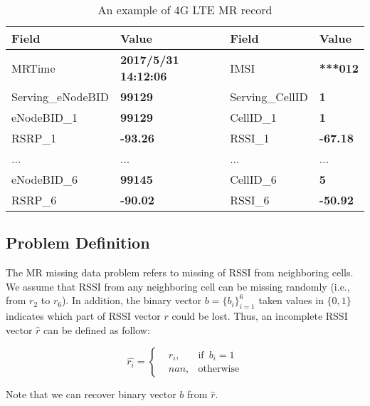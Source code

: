 \begin{table}\scriptsize
\caption{An example of 4G LTE MR record}\label{tab:mr}
  \centering
  \begin{tabular}{|l|l||l|l|}
  \hline
  \textbf{Field}    & \textbf{Value}                 & \textbf{Field}    & \textbf{Value}   \\ \hline \hline
  MRTime            & \textbf{2017/5/31 14:12:06}    & IMSI              & \textbf{***012}  \\ \hline
  Serving\_eNodeBID & \textbf{99129}                 & Serving\_CellID   & \textbf{1}       \\ \hline
  eNodeBID\_1       & \textbf{99129}                 & CellID\_1         & \textbf{1}       \\ \hline
  RSRP\_1           & \textbf{-93.26}                & RSSI\_1           & \textbf{-67.18}  \\ \hline
  ...               & ...                            & ...               & ...              \\ \hline
  eNodeBID\_6       & \textbf{99145}                 & CellID\_6         & \textbf{5}       \\ \hline
  RSRP\_6           & \textbf{-90.02}                & RSSI\_6           & \textbf{-50.92}  \\ \hline
  \end{tabular}
\end{table}

\subsection{Problem Definition}
The MR missing data problem refers to missing of RSSI from neighboring cells. We assume that RSSI from any neighboring cell can be missing randomly (i.e., from $r_2$ to $r_6$). In addition, the binary vector $b=\{b_i\}_{i=1}^6$ taken values in $\{0, 1\}$ indicates which part of RSSI vector $r$ could be lost. Thus, an incomplete RSSI vector $\hat{r}$ can be defined as follow:

\begin{equation}\label{eq:rssi}
\hat{r_i}=\left\{
\begin{aligned}
&r_i, & \text{if}\enspace b_i=1 \\
&nan,  & \text{otherwise}
\end{aligned}
\right.
\end{equation}

Note that we can recover binary vector $b$ from $\hat{r}$.

